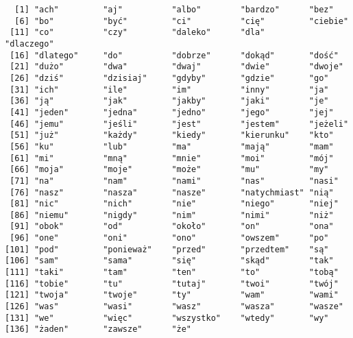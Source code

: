 \documentclass[12pt, twoside, openany]{report}\usepackage[]{graphicx}\usepackage[]{color}
\makeatletter
\newenvironment{kframe}{%
 \def\at@end@of@kframe{}%
 \ifinner\ifhmode%
  \def\at@end@of@kframe{\end{minipage}}%
  \begin{minipage}{\columnwidth}%
 \fi\fi%
 \def\FrameCommand##1{\hskip\@totalleftmargin \hskip-\fboxsep
 \colorbox{shadecolor}{##1}\hskip-\fboxsep
     \hskip-\linewidth \hskip-\@totalleftmargin \hskip\columnwidth}%
 \MakeFramed {\advance\hsize-\width
   \@totalleftmargin\z@ \linewidth\hsize
   \@setminipage}}%
 {\par\unskip\endMakeFramed%
 \at@end@of@kframe}
\newenvironment{knitrout}{}{} %
\theoremstyle{plain}
\makeatother
\begin{document}
\begin{knitrout}
\color{fgcolor}\begin{kframe}
\begin{verbatim}
  [1] "ach"         "aj"          "albo"        "bardzo"      "bez"        
  [6] "bo"          "być"         "ci"          "cię"         "ciebie"     
 [11] "co"          "czy"         "daleko"      "dla"         "dlaczego"   
 [16] "dlatego"     "do"          "dobrze"      "dokąd"       "dość"       
 [21] "dużo"        "dwa"         "dwaj"        "dwie"        "dwoje"      
 [26] "dziś"        "dzisiaj"     "gdyby"       "gdzie"       "go"         
 [31] "ich"         "ile"         "im"          "inny"        "ja"         
 [36] "ją"          "jak"         "jakby"       "jaki"        "je"         
 [41] "jeden"       "jedna"       "jedno"       "jego"        "jej"        
 [46] "jemu"        "jeśli"       "jest"        "jestem"      "jeżeli"     
 [51] "już"         "każdy"       "kiedy"       "kierunku"    "kto"        
 [56] "ku"          "lub"         "ma"          "mają"        "mam"        
 [61] "mi"          "mną"         "mnie"        "moi"         "mój"        
 [66] "moja"        "moje"        "może"        "mu"          "my"         
 [71] "na"          "nam"         "nami"        "nas"         "nasi"       
 [76] "nasz"        "nasza"       "nasze"       "natychmiast" "nią"        
 [81] "nic"         "nich"        "nie"         "niego"       "niej"       
 [86] "niemu"       "nigdy"       "nim"         "nimi"        "niż"        
 [91] "obok"        "od"          "około"       "on"          "ona"        
 [96] "one"         "oni"         "ono"         "owszem"      "po"         
[101] "pod"         "ponieważ"    "przed"       "przedtem"    "są"         
[106] "sam"         "sama"        "się"         "skąd"        "tak"        
[111] "taki"        "tam"         "ten"         "to"          "tobą"       
[116] "tobie"       "tu"          "tutaj"       "twoi"        "twój"       
[121] "twoja"       "twoje"       "ty"          "wam"         "wami"       
[126] "was"         "wasi"        "wasz"        "wasza"       "wasze"      
[131] "we"          "więc"        "wszystko"    "wtedy"       "wy"         
[136] "żaden"       "zawsze"      "że"         
\end{verbatim}
\end{kframe}
\end{knitrout}
% 
% 
% 
% 
\end{document}

